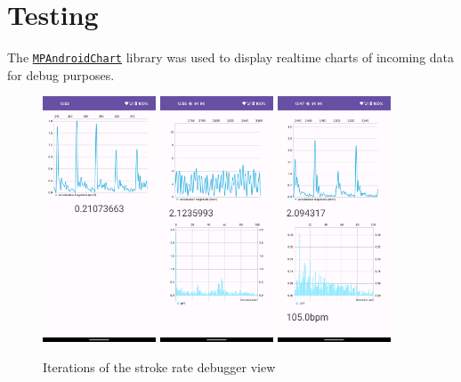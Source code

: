 \documentclass[11pt,twoside,a4paper]{report}
\begin{document}
\chapter{Testing}

The \href{https://github.com/PhilJay/MPAndroidChart}{\texttt{MPAndroidChart}} library was used to display realtime charts of incoming data for debug purposes.

\begin{figure}[h!]
  \centering
  \includegraphics[width=0.3\textwidth]{app-screenshot-accel-graph.png}
  \includegraphics[width=0.3\textwidth]{app-screenshot-accel-with-dft.png}
  \includegraphics[width=0.3\textwidth]{app-screenshot-accel-with-dft-105-bpm-metronome.png}
  \caption{Iterations of the stroke rate debugger view}
  \label{fig:appscreenshotaccel}
\end{figure}
\end{document}
